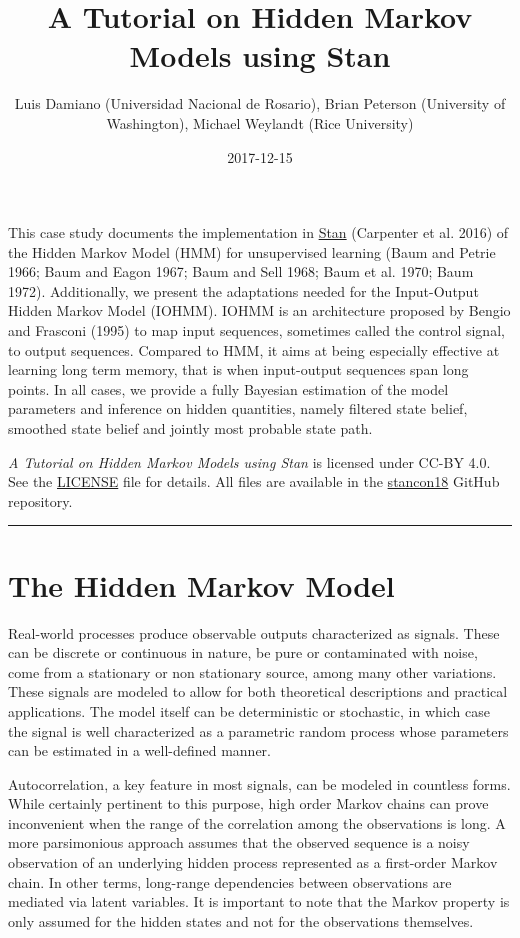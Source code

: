 \documentclass[]{article}
\title{A Tutorial on Hidden Markov Models using Stan}
\author{Luis Damiano (Universidad Nacional de Rosario), Brian Peterson
(University of Washington), Michael Weylandt (Rice University)}
\date{2017-12-15}
\begin{document}
\maketitle

{
\setcounter{tocdepth}{2}
\tableofcontents
}
This case study documents the implementation in
\href{http://mc-stan.org/}{Stan} (Carpenter et al. 2016) of the Hidden
Markov Model (HMM) for unsupervised learning (Baum and Petrie 1966; Baum
and Eagon 1967; Baum and Sell 1968; Baum et al. 1970; Baum 1972).
Additionally, we present the adaptations needed for the Input-Output
Hidden Markov Model (IOHMM). IOHMM is an architecture proposed by Bengio
and Frasconi (1995) to map input sequences, sometimes called the control
signal, to output sequences. Compared to HMM, it aims at being
especially effective at learning long term memory, that is when
input-output sequences span long points. In all cases, we provide a
fully Bayesian estimation of the model parameters and inference on
hidden quantities, namely filtered state belief, smoothed state belief
and jointly most probable state path.

\emph{A Tutorial on Hidden Markov Models using Stan} is licensed under
CC-BY 4.0. See the \href{LICENSE.md}{LICENSE} file for details. All
files are available in the
\href{https://github.com/luisdamiano/stancon18}{stancon18} GitHub
repository.

\begin{center}\rule{0.5\linewidth}{\linethickness}\end{center}

\section{The Hidden Markov Model}\label{the-hidden-markov-model}

Real-world processes produce observable outputs characterized as
signals. These can be discrete or continuous in nature, be pure or
contaminated with noise, come from a stationary or non stationary
source, among many other variations. These signals are modeled to allow
for both theoretical descriptions and practical applications. The model
itself can be deterministic or stochastic, in which case the signal is
well characterized as a parametric random process whose parameters can
be estimated in a well-defined manner.

Autocorrelation, a key feature in most signals, can be modeled in
countless forms. While certainly pertinent to this purpose, high order
Markov chains can prove inconvenient when the range of the correlation
among the observations is long. A more parsimonious approach assumes
that the observed sequence is a noisy observation of an underlying
hidden process represented as a first-order Markov chain. In other
terms, long-range dependencies between observations are mediated via
latent variables. It is important to note that the Markov property is
only assumed for the hidden states and not for the observations
themselves.
\end{document}
